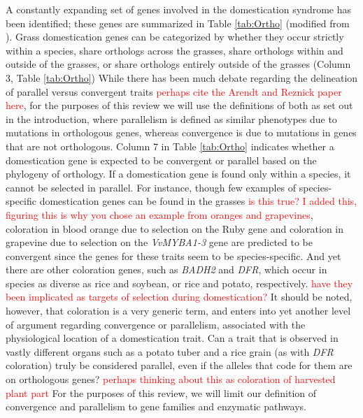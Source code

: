 \documentclass[12pt]{article}
\newcommand{\mbh}[1]{\textcolor{red}{\normalsize  #1}}
\begin{document}
A constantly expanding set of genes involved in the domestication syndrome has been identified; these genes are summarized in Table \ref{tab:Ortho} (modified from \citep{Lenser2013}).
Grass domestication genes can be categorized by whether they occur strictly within a species, share orthologs across the grasses, share orthologs within and outside of the grasses, or share orthologs entirely outside of the grasses (Column 3, Table \ref{tab:Ortho})
While there has been much debate regarding the delineation of parallel versus convergent traits \mbh{perhaps cite the Arendt and Reznick paper here}, for the purposes of this review we will use the definitions of both as set out in the introduction, where parallelism is defined as similar phenotypes due to mutations in orthologous genes, whereas convergence is due to mutations in genes that are not orthologous.
Column 7 in Table \ref{tab:Ortho} indicates whether a domestication gene is expected to be convergent or parallel based on the phylogeny of orthology.
If a domestication gene is found only within a species, it cannot be selected in parallel.
For instance, though few examples of species-specific domestication genes can be found in the grasses \mbh{is this true?  I added this, figuring this is why you chose an example from oranges and grapevines}, coloration in blood orange due to selection on the Ruby gene and coloration in grapevine due to selection on the \textit{VvMYBA1-3} gene are predicted to be convergent since the genes for these traits seem to be species-specific.
And yet there are other coloration genes, such as \textit{BADH2} and \textit{DFR}, which occur in species as diverse as rice and soybean, or rice and potato, respectively. \mbh{have they been implicated as targets of selection during domestication?}
It should be noted, however, that coloration is a very generic term, and enters into yet another level of argument regarding convergence or parallelism, associated with the physiological location of a domestication trait.
Can a trait that is observed in vastly different organs such as a potato tuber and a rice grain (as with \textit{DFR} coloration) truly be considered parallel, even if the alleles that code for them are on orthologous genes? \mbh{perhaps thinking about this as coloration of harvested plant part}
For the purposes of this review, we will limit our definition of convergence and parallelism to gene families and enzymatic pathways. 
\end{document}
